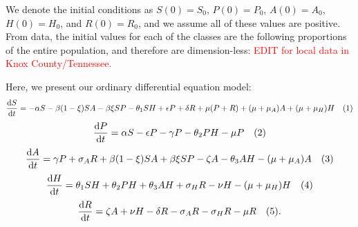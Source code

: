 \documentclass[12pt]{article}
\begin{document}
We denote the initial conditions as
$S(0)=S_{0}$, $P(0)=P_{0}$, $A(0)=A_{0}$, $H(0)=H_{0}$, and $R(0)=R_{0}$, and we assume all of these values are positive. From data, the initial values for each of the classes are the following proportions of the entire population, and therefore are dimension-less: \textcolor{red}{EDIT for local data in Knox County/Tennessee.}%
 
Here, we present our ordinary differential equation model: 
\[\dv{S}{t} = -\alpha S - \beta (1- \xi) SA  -\beta \xi SP- \theta_{1} SH +\epsilon P +\delta R +\mu (P+R) + (\mu+\mu_{A})A + (\mu+\mu_{H}) H \quad (1)\] 
\[\dv{P}{t} = \alpha S - \epsilon P  - \gamma P - \theta_{2}PH- \mu P    \quad(2)\]
\[\dv{A}{t} = \gamma P + \sigma_{A} R +\beta (1- \xi) SA  +\beta \xi SP -\zeta A - \theta_{3}AH-(\mu + \mu_{A})A   \quad (3)\]
\[\dv{H}{t} = \theta_{1}SH+\theta_{2}PH+\theta_{3}AH + \sigma_{H}R-\nu H-(\mu+\mu_{H})H  \quad (4)\]
\[\dv{R}{t} = \zeta A +\nu H -\delta R -\sigma_{A}R-\sigma_{H}R -\mu R\quad(5).\]
\end{document}
